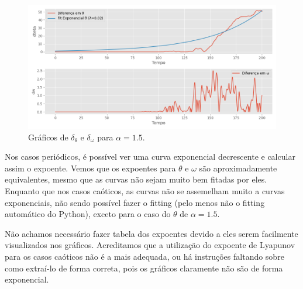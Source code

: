 \documentclass[12pt,a4paper]{article}
\begin{document}
\begin{figure}[H]
\centering
\includegraphics[width=\textwidth]{../tarefa-4d/diferencas_alpha_1.5.png}
\caption{Gráficos de $\delta_{\theta}$ e $\delta_{\omega}$ para $\alpha = 1.5$.}
\end{figure}

Nos casos periódicos, é possível ver uma curva exponencial decrescente e calcular assim o expoente. Vemos que os expoentes para $\theta$ e $\omega$ são aproximadamente equivalentes, mesmo que as curvas não sejam muito bem fitadas por eles. Enquanto que nos casos caóticos, as curvas não se assemelham muito a curvas exponenciais, não sendo possível fazer o fitting (pelo menos não o fitting automático do Python), exceto para o caso do $\theta$ de $\alpha = 1.5$. 

Não achamos necessário fazer tabela dos expoentes devido a eles serem facilmente visualizados nos gráficos. Acreditamos que a utilização do expoente de Lyapunov para os casos caóticos não é a mais adequada, ou há instruções faltando sobre como extraí-lo de forma correta, pois os gráficos claramente não são de forma exponencial.
\end{document}
